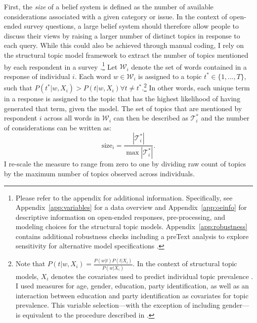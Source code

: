 First, the \textit{size} of a belief system is defined as the number of available considerations associated with a given category or issue. In the context of open-ended survey questions, a large belief system should therefore allow people to discuss their views by raising a larger number of distinct topics in response to each query. While this could also be achieved through manual coding, I rely on the structural topic model framework to extract the number of topics mentioned by each respondent in a survey \citep{roberts2014structural}.\footnote{Please refer to the appendix for additional information. Specifically, see Appendix~\ref{app:variables} for a data overview and Appendix~\ref{app:oeinfo} for descriptive information on open-ended responses, pre-processing, and modeling choices for the structural topic models. Appendix~\ref{app:robustness} contains additional robustness checks including a preText analysis to explore sensitivity for alternative model specifications \citep{denny2018text}.} Let $\mathcal{W}_i$ denote the set of words contained in a response of individual $i$. Each word $w\in\mathcal{W}_i$ is assigned to a topic $t^* \in \{1,...,T\} $, such that $P(t^*|w,X_i) > P(t|w,X_i) \forall t\neq t^*$.\footnote{Note that $P(t|w,X_i)=\tfrac{P(w|t)P(t|X_i)}{P(w|X_i)}$. In the context of structural topic models, $X_i$ denotes the covariates used to predict individual topic prevalence \citep[see][for details]{roberts2014structural}. I used measures for age, gender, education, party identification, as well as an interaction between education and party identification as covariates for topic prevalence. This variable selection---with the exception of including gender---is equivalent to the procedure described in \citet{roberts2014structural}.} In other words, each unique term in a response is assigned to the topic that has the highest likelihood of having generated that term, given the model. The set of topics that are mentioned by respondent $i$ across all words in $\mathcal{W}_i$ can then be described as $\mathcal{T}^*_i$ and the number of considerations can be written as:
\begin{equation}
\text{size}_i = \dfrac{|\mathcal{T}^*_i|}{\max|\mathcal{T}^*_i|}.
\end{equation}
I re-scale the measure to range from zero to one by dividing raw count of topics by the maximum number of topics observed across individuals.

